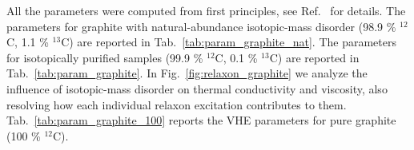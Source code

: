 \documentclass[
prb,
twocolumn,
superscriptaddress,
 amsmath,amssymb,
 aps,
longbibliography,
]{revtex4-2}
\begin{document}
All the parameters were computed from first principles, see Ref.~\cite{Simoncelli2020} for details. The parameters for graphite with natural-abundance isotopic-mass disorder (98.9 \% $^{12}$C, 1.1 \% $^{13}$C) are reported in Tab.~\ref{tab:param_graphite_nat}. The parameters for isotopically purified samples (99.9 \% $^{12}$C, 0.1 \% $^{13}$C) are reported in Tab.~\ref{tab:param_graphite}.
In Fig.~\ref{fig:relaxon_graphite} we analyze the influence of isotopic-mass disorder on thermal conductivity and viscosity, also resolving how each individual relaxon excitation contributes to them.
Tab.~\ref{tab:param_graphite_100} reports the VHE parameters for pure graphite (100 \% $^{12}$C).








\begin{table}[htbp!]
  \caption{Parameters entering the viscous heat equations for graphite with natural isotope content. We report here only the in-plane components of the tensors needed to perform the calculations:
$\kappa^{ij}_{\rm P}=\kappa_{\rm P}\delta^{ij}$, $\kappa^{ij}_{\rm C}=\kappa_{\rm C}\delta^{ij}$, $K^{ij}_{S}=K_{S}\delta^{ij}$, ${D}_U^{ij}={D}_U\delta^{ij}$, $A=A^i\;\forall \;i$, $W^j_{0i}=W^j_{i0}= W\delta^{ij}$, where the indexes $i,j$ represent the in-plane directions $x,y$ only ($i,j=1,2$).}
  \label{tab:param_graphite_nat}
  \centering
{}
\end{table}
\end{document}
